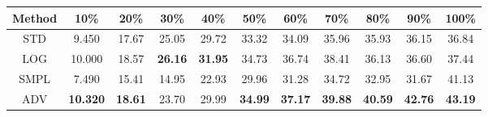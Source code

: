 \documentclass{standalone}
\begin{document}
\begin{tabular}{c|cccccccccc}
      \toprule
      Method & 10\% & 20\% & 30\% & 40\% & 50\% & 60\% & 70\% & 80\% & 90\% & 100\% \\
      \midrule
STD & 9.450 & 17.67 & 25.05 & 29.72 & 33.32 & 34.09 & 35.96 & 35.93 & 36.15 & 36.84\\
LOG & 10.000 & 18.57 & \textbf{26.16} & \textbf{31.95} & 34.73 & 36.74 & 38.41 & 36.13 & 36.60 & 37.44\\
SMPL & 7.490 & 15.41 & 14.95 & 22.93 & 29.96 & 31.28 & 34.72 & 32.95 & 31.67 & 41.13\\
ADV & \textbf{10.320} & \textbf{18.61} & 23.70 & 29.99 & \textbf{34.99} & \textbf{37.17} & \textbf{39.88} & \textbf{40.59} & \textbf{42.76} & \textbf{43.19}\\
  \bottomrule
\end{tabular}
\end{document}
